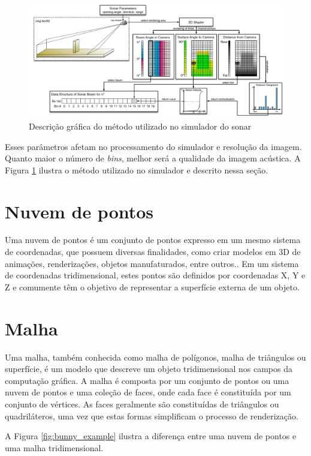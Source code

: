 \begin{figure}[H]
    \centering
    \caption{Descrição gráfica do método utilizado no simulador do sonar}
    \label{fig:gpu_sonar_sim}
    \includegraphics[scale=0.35]{dados/figuras/gpu_sonar.png}
\end{figure}

Esses parâmetros afetam no processamento do simulador e resolução da imagem. Quanto maior o número de \textit{bins}, melhor será a qualidade da imagem acústica. A Figura \ref{fig:gpu_sonar_sim} ilustra o método utilizado no simulador e descrito nessa seção.

\section{Nuvem de pontos}
\label{sec:point_cloud}
Uma nuvem de pontos é um conjunto de pontos expresso em um mesmo sistema de coordenadas, que possuem diversas finalidades, como criar modelos em 3D de animações, renderizações, objetos manufaturados, entre outros.. 
Em um sistema de coordenadas tridimensional, estes pontos são definidos por coordenadas X, Y e Z e comumente têm o objetivo de representar a superfície externa de um objeto.

\iffalse
\section{Malha}
\label{sec:mesh}
Uma malha, também conhecida como malha de polígonos, malha de triângulos ou superfície, é um modelo que descreve um objeto tridimensional nos campos da computação gráfica. 
A malha é composta por um conjunto de pontos ou uma nuvem de pontos e uma coleção de faces, onde cada face é constituída por um conjunto de vértices. 
As faces geralmente são constituídas de triângulos ou quadriláteros, uma vez que estas formas simplificam o processo de renderização.

A Figura \ref{fig:bunny_example} ilustra a diferença entre uma nuvem de pontos e uma malha tridimensional.

